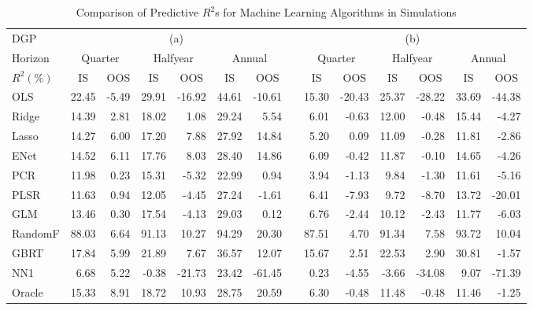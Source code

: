\documentclass[]{article}
\begin{document}
\begin{table}[ht]
\begin{threeparttable}
\centering
\setlength{\tabcolsep}{6pt}
\caption{Comparison of Predictive $R^2$s for Machine Learning Algorithms in Simulations}
\begin{tabular}{lrrrrrrcrrrrrr}
DGP & \multicolumn{6}{c}{(a)} && \multicolumn{6}{c}{(b)} \\
  \Xhline{2\arrayrulewidth}\noalign{\smallskip}
Horizon & \multicolumn{2}{c}{Quarter} & \multicolumn{2}{c}{Halfyear} & \multicolumn{2}{c}{Annual} && \multicolumn{2}{c}{Quarter} & \multicolumn{2}{c}{Halfyear} & \multicolumn{2}{c}{Annual} \\ 
   \noalign{\smallskip}\hline\noalign{\smallskip}
$R^2(\%)$ & \multicolumn{1}{c}{IS} & \multicolumn{1}{c}{OOS} & \multicolumn{1}{c}{IS} & \multicolumn{1}{c}{OOS} &\multicolumn{1}{c}{IS} & \multicolumn{1}{c}{OOS} && \multicolumn{1}{c}{IS} & \multicolumn{1}{c}{OOS} &\multicolumn{1}{c}{IS} & \multicolumn{1}{c}{OOS} & \multicolumn{1}{c}{IS} & \multicolumn{1}{c}{OOS}\\ 
  \noalign{\smallskip}\hline\noalign{\smallskip}
OLS & 22.45 & -5.49 & 29.91 & -16.92 & 44.61 & -10.61 && 15.30 & -20.43 & 25.37 & -28.22 & 33.69 & -44.38 \\ 
Ridge & 14.39 & 2.81 & 18.02 & 1.08 & 29.24 & 5.54 && 6.01 & -0.63 & 12.00 & -0.48 & 15.44 & -4.27 \\ 
Lasso & 14.27 & 6.00 & 17.20 & 7.88 & 27.92 & 14.84 && 5.20 & 0.09 & 11.09 & -0.28 & 11.81 & -2.86 \\ 
ENet & 14.52 & 6.11 & 17.76 & 8.03 & 28.40 & 14.86 && 6.09 & -0.42 & 11.87 & -0.10 & 14.65 & -4.26 \\ 
PCR & 11.98 & 0.23 & 15.31 & -5.32 & 22.99 & 0.94 && 3.94 & -1.13 & 9.84 & -1.30 & 11.61 & -5.16 \\ 
PLSR & 11.63 & 0.94 & 12.05 & -4.45 & 27.24 & -1.61 && 6.41 & -7.93 & 9.72 & -8.70 & 13.72 & -20.01 \\ 
GLM & 13.46 & 0.30 & 17.54 & -4.13 & 29.03 & 0.12 && 6.76 & -2.44 & 10.12 & -2.43 & 11.77 & -6.03 \\ 
RandomF & 88.03 & 6.64 & 91.13 & 10.27 & 94.29 & 20.30 && 87.51 & 4.70 & 91.34 & 7.58 & 93.72 & 10.04 \\ 
GBRT & 17.84 & 5.99 & 21.89 & 7.67 & 36.57 & 12.07 && 15.67 & 2.51 & 22.53 & 2.90 & 30.81 & -1.57 \\ 
NN1 & 6.68 & 5.22 & -0.38 & -21.73 & 23.42 & -61.45 && 0.23 & -4.55 & -3.66 & -34.08 & 9.07 & -71.39 \\ 
Oracle & 15.33 & 8.91 & 18.72 & 10.93 & 28.75 & 20.59 && 6.30 & -0.48 & 11.48 & -0.48 & 11.46 & -1.25 \\ 

\end{tabular}
\end{threeparttable}
\end{table}
\end{document}
